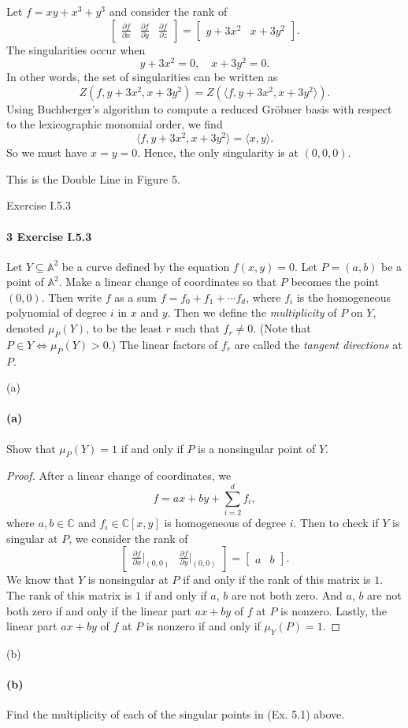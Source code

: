 \documentclass[12pt]{article}
\newlength{\myparskip}
\newenvironment{fullbox}{\begin{lrbox}{\savefullbox}\begin{minipage}{\dimexpr\textwidth-2\fboxsep\relax}\setlength{\parskip}{\myparskip}}{\end{minipage}\end{lrbox}\framebox[\textwidth]{\usebox{\savefullbox}}}
\newenvironment{pbox}[1][]{\begin{fullbox}\ifx#1\empty\else\paragraph{#1}\fi}{\end{fullbox}}
\newcommand{\C}{\mathbb{C}}
\newcommand{\<}{\langle}
\renewcommand{\>}{\rangle}
\newcommand{\A}{\mathbb{A}}
\newcommand{\mat}[1]{\begin{bmatrix}#1\end{bmatrix}}
\newcommand{\pdv}[2]{\frac{\partial #1}{\partial #2}}
\begin{document}
Let $f = xy + x^3 + y^3$ and consider the rank of
\[
    \mat{\pdv{f}{x} & \pdv{f}{y} & \pdv{f}{z}} = \mat{y + 3x^2 & x + 3y^2}.
\]
The singularities occur when
\[
    y + 3x^2 = 0, \quad x + 3y^2 = 0.
\]
In other words, the set of singularities can be written as
\[
    Z(f, y+3x^2, x+3y^2) = Z(\<f, y+3x^2, x+3y^2\>).
\]
Using Buchberger's algorithm to compute a reduced Gr\"obner basis with respect to the lexicographic monomial order, we find
\[
    \<f, y+3x^2, x+3y^2\> = \<x, y\>.
\]
So we must have $x = y = 0$. Hence, the only singularity is at $(0, 0, 0)$.

This is the Double Line in Figure 5.



\newpage
\begin{pbox}[3 Exercise I.5.3]
    Let $Y \subseteq \A^2$ be a curve defined by the equation $f(x, y) = 0$. Let $P = (a, b)$ be a point of $\A^2$. Make a linear change of coordinates so that $P$ becomes the point $(0, 0)$. Then write $f$ as a sum $f = f_0 + f_1 + \cdots f_d$, where $f_i$ is the homogeneous polynomial of degree $i$ in $x$ and $y$. Then we define the \textit{multiplicity} of $P$ on $Y$, denoted $\mu_P(Y)$, to be the least $r$ such that $f_r \ne 0$. (Note that $P \in Y \iff \mu_P(Y) > 0$.) The linear factors of $f_r$ are called the \textit{tangent directions} at $P$.
\end{pbox}

\begin{pbox}[(a)]
    Show that $\mu_P(Y) = 1$ if and only if $P$ is a nonsingular point of $Y$.
\end{pbox}

\begin{proof}
    After a linear change of coordinates, we
    \[
        f = ax + by + \sum_{i=2}^{d} f_i,
    \]
    where $a, b \in \C$ and $f_i \in \C[x, y]$ is homogeneous of degree $i$. Then to check if $Y$ is singular at $P$, we consider the rank of
    \[
        \mat{\pdv{f}{x}\big|_{(0,0)} & \pdv{f}{y}\big|_{(0,0)}} = \mat{a & b}.
    \]
    We know that $Y$ is nonsingular at $P$ if and only if the rank of this matrix is $1$. The rank of this matrix is $1$ if and only if $a$, $b$ are not both zero. And $a$, $b$ are not both zero if and only if the linear part $ax + by$ of $f$ at $P$ is nonzero. Lastly, the linear part $ax + by$ of $f$ at $P$ is nonzero if and only if $\mu_Y(P) = 1$.
\end{proof}

\begin{pbox}[(b)]
    Find the multiplicity of each of the singular points in (Ex. 5.1) above.
\end{pbox}
\end{document}
